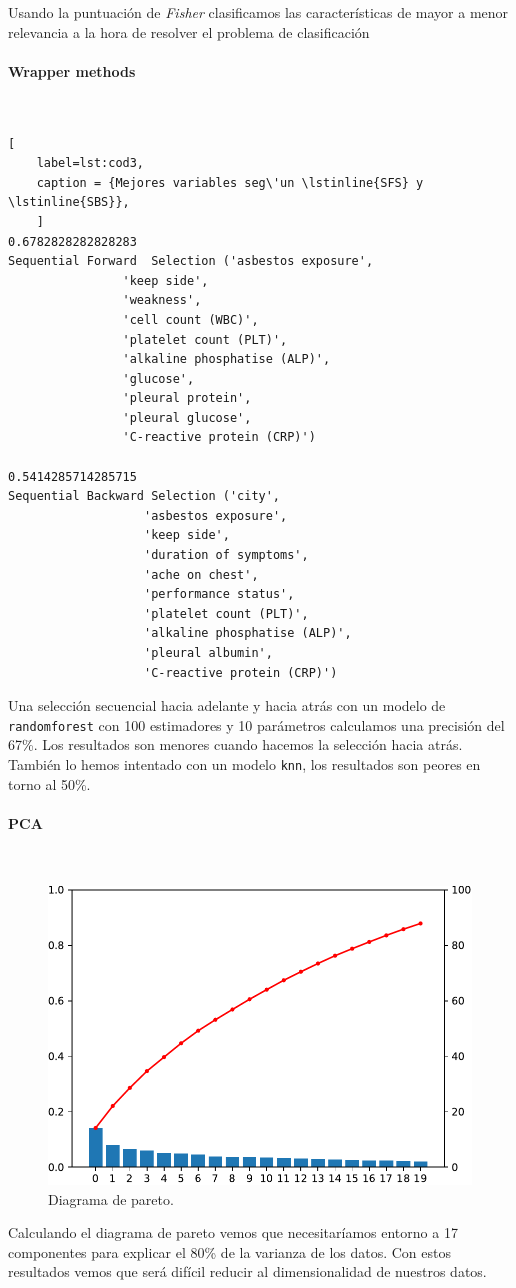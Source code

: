 \documentclass{article}
\newcommand{\subsubsubsection}[1]{\paragraph{#1}\mbox{}\\}
\begin{document}
Usando la puntuación de \textit{Fisher} clasificamos las
características de mayor a menor relevancia a la hora de resolver el
problema de clasificación

\newpage
\subsubsubsection{Wrapper methods}
\begin{lstlisting}[
	label=lst:cod3,
	caption = {Mejores variables seg\'un \lstinline{SFS} y \lstinline{SBS}},
	]
0.6782828282828283
Sequential Forward  Selection ('asbestos exposure',
				'keep side',
				'weakness',
				'cell count (WBC)',
				'platelet count (PLT)',
				'alkaline phosphatise (ALP)',
				'glucose',
				'pleural protein',
				'pleural glucose',
				'C-reactive protein (CRP)')

0.5414285714285715
Sequential Backward Selection ('city',
			       'asbestos exposure',
			       'keep side',
			       'duration of symptoms',
			       'ache on chest',
			       'performance status',
			       'platelet count (PLT)',
			       'alkaline phosphatise (ALP)',
			       'pleural albumin',
			       'C-reactive protein (CRP)')
\end{lstlisting}

Una selección secuencial hacia adelante y hacia atrás con un modelo de
\lstinline{randomforest} con 100 estimadores y 10 parámetros
calculamos una precisión del 67\%. Los resultados son menores cuando
hacemos la selección hacia atrás. También lo hemos intentado con un
modelo \lstinline{knn}, los resultados son peores en torno al 50\%.

\subsubsubsection{PCA}

\begin{figure}
\centering
\vspace{-1cm}
\includegraphics[width = 0.9\linewidth]{../images/pareto.pdf}
\caption{Diagrama de pareto.}
\end{figure}
Calculando el diagrama de pareto vemos que necesitaríamos entorno a 17
componentes para explicar el 80\% de la varianza de los datos. Con
estos resultados vemos que  será difícil reducir al dimensionalidad
de nuestros datos.
\end{document}
